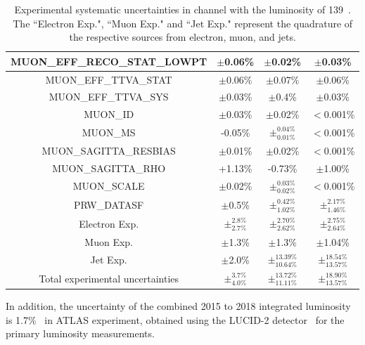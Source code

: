 \begin{table}[H]
\begin{center}
\begin{tabular}{|c|c|c|c|}
MUON\_EFF\_RECO\_STAT\_LOWPT&$\pm$0.06\%&$\pm$0.02\%&$\pm$0.03\%\\
\hline
MUON\_EFF\_TTVA\_STAT&$\pm$0.06\%&$\pm$0.07\%&$\pm$0.06\%\\
\hline
MUON\_EFF\_TTVA\_SYS&$\pm$0.03\%&$\pm$0.4\%&$\pm$0.03\%\\
\hline
MUON\_ID&$\pm$0.03\%&$\pm$0.02\%&$<$0.001\%\\
\hline
MUON\_MS&-0.05\%&$\pm^{0.04\%}_{0.01\%}$&$<$0.001\%\\
\hline
MUON\_SAGITTA\_RESBIAS&$\pm$0.01\%&$\pm$0.02\%&$<$0.001\%\\
\hline
MUON\_SAGITTA\_RHO&+1.13\%&-0.73\%&$\pm$1.00\%\\
\hline
MUON\_SCALE&$\pm$0.02\%&$\pm^{0.03\%}_{0.02\%}$&$<$0.001\%\\
\hline
PRW\_DATASF&$\pm$0.5\%&$\pm^{0.42\%}_{1.02\%}$&$\pm^{2.17\%}_{1.46\%}$\\
\hline
\hline
Electron Exp.&$\pm^{2.8\%}_{2.7\%}$&$\pm^{2.70\%}_{2.62\%}$&$\pm^{2.75\%}_{2.64\%}$\\
\hline
Muon Exp.&$\pm$1.3\%&$\pm$1.3\%&$\pm$1.04\%\\
\hline
Jet Exp.&$\pm$2.0\%&$\pm^{13.39\%}_{10.64\%}$&$\pm^{18.54\%}_{13.57\%}$\\
\hline
\hline
Total experimental uncertainties &$\pm^{3.7\%}_{4.0\%}$&$\pm^{13.72\%}_{11.11\%}$&$\pm^{18.90\%}_{13.57\%}$\\
\hline
\end{tabular}
\caption{
Experimental systematic uncertainties in \llll channel with the luminosity of 139~\ifb.
The ``Electron Exp.", ``Muon Exp." and ``Jet Exp." represent the quadrature of the respective sources from electron, muon, and jets.
}
\label{tab:syst_exp_num}
\end{center}
\end{table}

In addition, the uncertainty of the combined 2015 to 2018 integrated luminosity is 1.7\%~\cite{ATLAS-CONF-2019-021} in ATLAS experiment,
obtained using the LUCID-2 detector~\cite{Avoni_2018} for the primary luminosity measurements.

